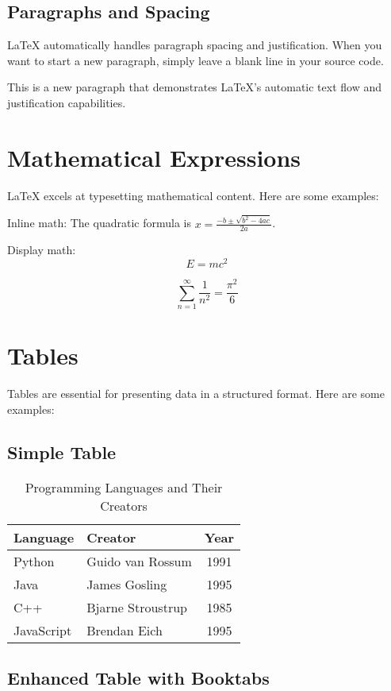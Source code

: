 \documentclass[12pt]{article}
\begin{document}
\subsection{Paragraphs and Spacing}

LaTeX automatically handles paragraph spacing and justification. When you want to start a new paragraph, simply leave a blank line in your source code.

This is a new paragraph that demonstrates LaTeX's automatic text flow and justification capabilities.

\section{Mathematical Expressions}

LaTeX excels at typesetting mathematical content. Here are some examples:

Inline math: The quadratic formula is $x = \frac{-b \pm \sqrt{b^2 - 4ac}}{2a}$.

Display math:
\[
E = mc^2
\]

\[
\sum_{n=1}^{\infty} \frac{1}{n^2} = \frac{\pi^2}{6}
\]

\section{Tables}

Tables are essential for presenting data in a structured format. Here are some examples:

\subsection{Simple Table}

\begin{table}[h]
\centering
\caption{Programming Languages and Their Creators}
\begin{tabular}{|l|l|c|}
\hline
\textbf{Language} & \textbf{Creator} & \textbf{Year} \\
\hline
Python & Guido van Rossum & 1991 \\
Java & James Gosling & 1995 \\
C++ & Bjarne Stroustrup & 1985 \\
JavaScript & Brendan Eich & 1995 \\
\hline
\end{tabular}
\end{table}

\subsection{Enhanced Table with Booktabs}
\end{document}
